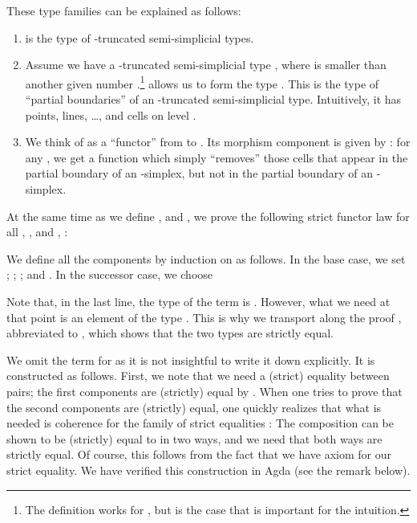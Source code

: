 \documentclass[a4paper,reqno]{amsart}
\theoremstyle{plain}
\theoremstyle{definition}
\begin{document}
These type families can be explained as follows:
\begin{enumerate}
 \item  is the type of -truncated semi-simplicial types.
 \item Assume we have a -truncated semi-simplicial type , where  is smaller than another given number .\footnote{The definition works for , but  is the case that is important for the intuition.} 
 allows us to form the type .
This is the type of ``partial boundaries'' of an -truncated semi-simplicial type.
Intuitively, it has  points,  lines, \ldots, and  cells on level .
 \item We think of  as a ``functor'' from  to . 
Its morphism component is given by : for any , we get a function  which simply ``removes'' those cells that appear in the partial boundary of an -simplex, but not in the partial boundary of an -simplex.
\end{enumerate}
At the same time as we define ,  and , we prove the following strict functor law for all , , and , :


We define all the components by induction on  as follows.
In the base case, we set
; ; ; and .
In the successor case, we choose

Note that, in the last line, the type of the term  is .
However, what we need at that point is an element of the type .
This is why we transport along the proof , abbreviated to , which shows that the two types are strictly equal.

We omit the term for  as it is not insightful to write it down explicitly.
It is constructed as follows.
First, we note that we need a (strict) equality between pairs; the first components are (strictly) equal by .
When one tries to prove that the second components are (strictly) equal, one quickly realizes that what is needed is coherence for the family of strict equalities :
The composition  can be shown to be (strictly) equal to  in two ways, and we need that both ways are strictly equal.
Of course, this follows from the fact that we have axiom  for our strict equality.
We have verified this construction in Agda (see the remark below). 
\end{document}
